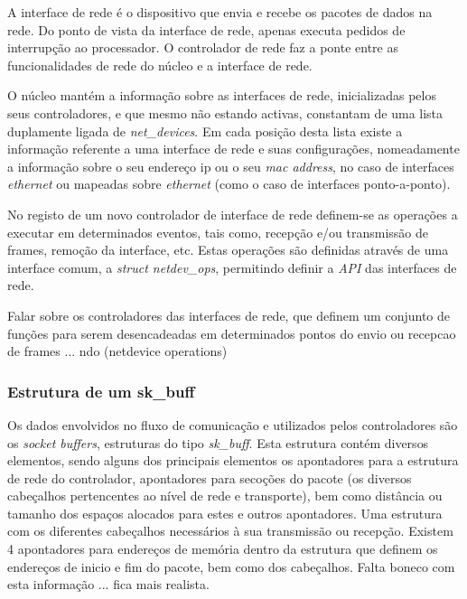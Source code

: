 A interface de rede é o dispositivo que envia e recebe os pacotes de dados na rede.
Do ponto de vista da interface de rede, apenas executa pedidos de interrupção ao processador.
O controlador de rede faz a ponte entre as funcionalidades de rede do núcleo e a interface de rede.

O núcleo mantém a informação sobre as interfaces de rede, inicializadas pelos seus controladores, e que mesmo não estando activas, constantam de uma lista duplamente ligada de \textit{net\_devices}.
Em cada posição desta lista existe a informação referente a uma interface de rede e suas configurações, nomeadamente a informação sobre o seu endereço ip ou o seu \textit{mac address}, no caso de interfaces \textit{ethernet} ou mapeadas sobre \textit{ethernet} (como o caso de interfaces ponto-a-ponto).

No registo de um novo controlador de interface de rede definem-se as operações a executar em determinados eventos, tais como, recepção e/ou transmissão de frames, remoção da interface, etc.
Estas operações são definidas através de uma interface comum, a \textit{struct netdev\_ops}, permitindo definir a \textit{API} das interfaces de rede.

Falar sobre os controladores das interfaces de rede, que definem um conjunto de funções para serem desencadeadas em determinados pontos do envio ou recepcao de frames ... ndo (netdevice operations) 
 
\subsubsection{Estrutura de um sk\_buff}
\label{subsub:sk_buff}

Os dados envolvidos no fluxo de comunicação e utilizados pelos controladores são os \textit{socket buffers}, estruturas do tipo \textit{sk\_buff}.
Esta estrutura contém diversos elementos, sendo alguns dos principais elementos os apontadores para a estrutura de rede do controlador, apontadores para secoções do pacote (os diversos cabeçalhos pertencentes ao nível de rede e transporte), bem como distância ou tamanho dos espaços alocados para estes e outros apontadores.
Uma estrutura com os diferentes cabeçalhos necessários à sua transmissão ou recepção.
Existem 4 apontadores para endereços de memória dentro da estrutura que definem os endereços de inicio e fim do pacote, bem como dos cabeçalhos.
Falta boneco com esta informação ... fica mais realista.

